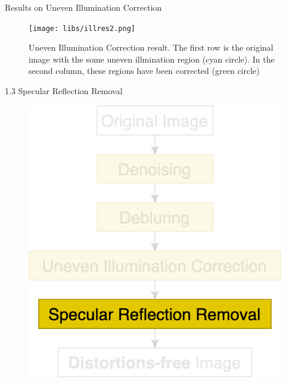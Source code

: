 \documentclass{libs/ufc_format}
\begin{document}
\begin{frame}{\small Results on Uneven Illumination Correction}

    \begin{figure}
        \centering
        \texttt{[image: libs/illres2.png]}
        \caption{Uneven Illumination Correction result. The first row is the original image with the some uneven illmination region (cyan circle). In the second column, these regions have been corrected (green circle)}
        \label{uneven_illumination_correction2}
    \end{figure}
\end{frame}
\begin{frame}{ 1.3 Specular Reflection Removal}
    \begin{figure}
        \includegraphics[scale=0.25]{libs/stage1.4.png}
    \end{figure}
\end{frame}
\end{document}
